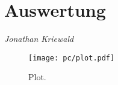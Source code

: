 \section{Auswertung}
\label{sec:Auswertung}
\footnotesize{\textit{Jonathan Kriewald}}

\begin{figure}
  \centering
  \texttt{[image: pc/plot.pdf]}
  \caption{Plot.}
  \label{fig:plot}
\end{figure}
